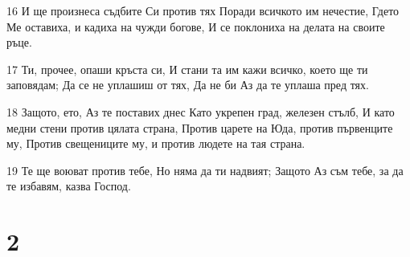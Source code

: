 \par 16 И ще произнеса съдбите Си против тях Поради всичкото им нечестие, Гдето Ме оставиха, и кадиха на чужди богове, И се поклониха на делата на своите ръце.
\par 17 Ти, прочее, опаши кръста си, И стани та им кажи всичко, което ще ти заповядам; Да се не уплашиш от тях, Да не би Аз да те уплаша пред тях.
\par 18 Защото, ето, Аз те поставих днес Като укрепен град, железен стълб, И като медни стени против цялата страна, Против царете на Юда, против първенците му, Против свещениците му, и против людете на тая страна.
\par 19 Те ще воюват против тебе, Но няма да ти надвият; Защото Аз съм тебе, за да те избавям, казва Господ.

\chapter{2}

